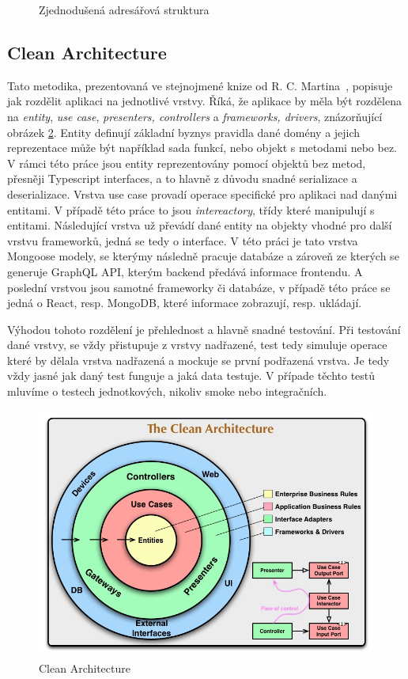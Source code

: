\begin{figure}
  \caption{Zjednodušená adresářová struktura}
  \label{fig:modules}
\end{figure}

\subsection{Clean Architecture}
Tato metodika, prezentovaná ve stejnojmené knize od R. C. Martina~\cite{martin_2018_clean}, popisuje jak rozdělit aplikaci na jednotlivé vrstvy. Říká, že aplikace by měla být rozdělena na \emph{entity}, \emph{use case}, \emph{presenters, controllers} a \emph{frameworks, drivers}, znázorňující obrázek \ref{fig:clean_architecture}.
Entity definují základní byznys pravidla dané domény a jejich reprezentace může být například sada funkcí, nebo objekt s metodami nebo bez. V rámci této práce jsou entity reprezentovány pomocí objektů bez metod, přesněji Typescript interfaces, a to hlavně z důvodu snadné serializace a deserializace.
Vrstva use case provadí operace specifické pro aplikaci nad danými entitami. V případě této práce to jsou \emph{intereactory}, třídy které manipulují s entitami.
Následující vrstva už převádí dané entity na objekty vhodné pro další vrstvu frameworků, jedná se tedy o interface. V této práci je tato vrstva Mongoose modely, se kterýmy následně pracuje databáze a zároveň ze kterých se generuje GraphQL API, kterým backend předává informace frontendu. A poslední vrstvou jsou samotné frameworky či databáze, v případě této práce se jedná o React, resp. MongoDB, které informace zobrazují, resp. ukládají.

Výhodou tohoto rozdělení je přehlednost a hlavně snadné testování. Při testování dané vrstvy, se vždy přistupuje z vrstvy nadřazené, test tedy simuluje operace které by dělala vrstva nadřazená a mockuje se první podřazená vrstva. Je tedy vždy jasné jak daný test funguje a jaká data testuje. V případe těchto testů mluvíme o testech jednotkových, nikoliv smoke nebo integračních.

\begin{figure}
  \centering
  \includegraphics[width=\textwidth]{assets/clean_architecture.jpg}
  \caption{Clean Architecture }
  \label{fig:clean_architecture}
\end{figure}
